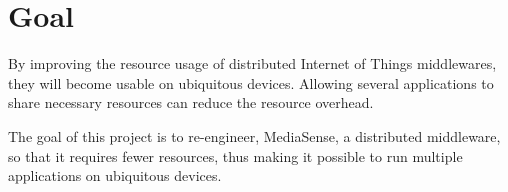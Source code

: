 \section{Goal}
By improving the resource usage of distributed Internet of Things middlewares, they will become usable on ubiquitous devices. Allowing several applications to share necessary resources can reduce the resource overhead. 

The goal of this project is to re-engineer, MediaSense, a distributed middleware, so that it requires fewer resources, thus making it possible to run multiple applications on ubiquitous devices. 
